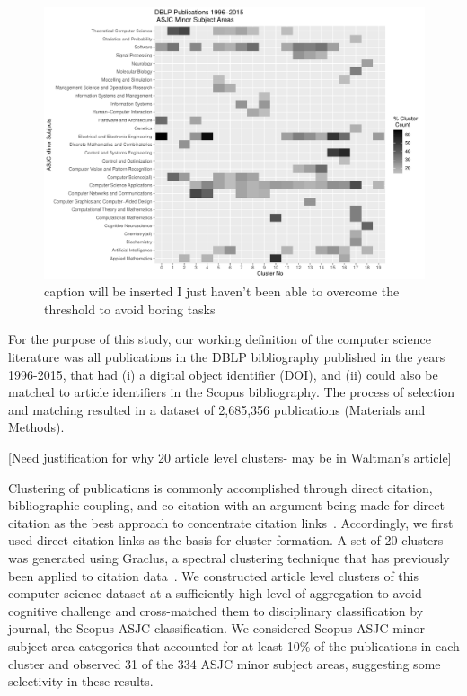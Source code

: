 \begin{figure}[ht]
  \includegraphics[scale=0.5]{scopus_dblp_graclus3.pdf}
\caption{caption will be inserted I just haven't been able to overcome the threshold to avoid boring tasks}
\label{fig:heatmap}       %
\end{figure}
For the purpose of this study, our working definition of the computer science literature was all publications in the DBLP bibliography published in the years 1996-2015, that had (i) a digital object identifier (DOI), and (ii) could also be matched to article identifiers in the Scopus bibliography. The process of selection and matching resulted in a dataset of 2,685,356 publications (Materials and Methods). 

[Need justification for why 20 article level clusters- may be in Waltman's article]

Clustering of publications is commonly accomplished through direct citation, bibliographic coupling, and co-citation with an argument being made for direct citation as the best approach to concentrate citation links~\cite{klavans_which_2017}. Accordingly, we first used direct citation links as the basis for cluster formation. A set of 20 clusters was generated using Graclus, a spectral clustering technique that has previously been applied to citation data~\cite{graclus_2007,subelj_clustering_2016}. We constructed article level clusters of this computer science dataset at a sufficiently high level of aggregation to avoid cognitive challenge and cross-matched them to disciplinary classification by journal, the Scopus ASJC classification. We considered Scopus ASJC minor subject area categories that accounted for at least 10\% of the publications in each cluster and observed 31 of the 334 ASJC minor subject areas, suggesting some selectivity in these results.  

